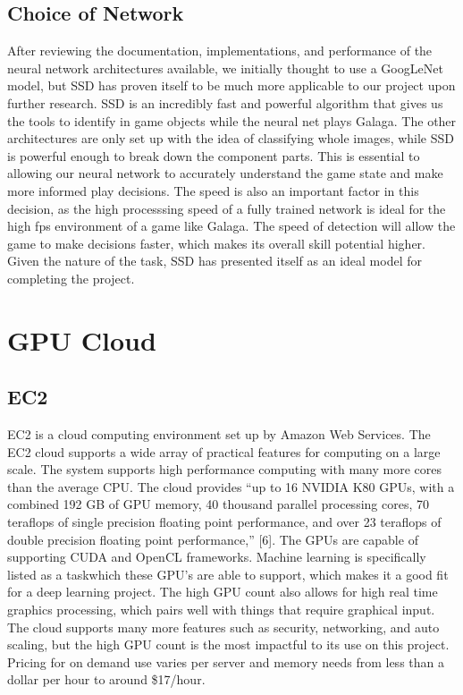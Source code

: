 \documentclass{scrreprt}
\begin{document}
\subsection{Choice of Network}
After reviewing the documentation, implementations, and performance of the neural network architectures available, we initially thought to use a GoogLeNet model, but SSD has proven itself to be much more applicable to our project upon further research. 
SSD is an incredibly fast and powerful algorithm that gives us the tools to identify in game objects while the neural net plays Galaga.
The other architectures are only set up with the idea of classifying whole images, while SSD is powerful enough to break down the component parts.
This is essential to allowing our neural network to accurately understand the game state and make more informed play decisions. 
The speed is also an important factor in this decision, as the high processsing speed of a fully trained network is ideal for the high fps environment of a game like Galaga. 
The speed of detection will allow the game to make decisions faster, which makes its overall skill potential higher.
Given the nature of the task, SSD has presented itself as an ideal model for completing the project.

\section{GPU Cloud}
\subsection{EC2}
EC2 is a cloud computing environment set up by Amazon Web Services. The EC2 cloud supports a wide array of practical features for computing on a large scale. 
The system supports high performance computing with many more cores than the average CPU. The cloud provides “up to 16 NVIDIA K80 GPUs, with a combined 192 GB of GPU memory, 40 thousand parallel processing cores, 70 teraflops of single precision floating point performance, and over 23 teraflops of double precision floating point performance,” [6]. 
The GPUs are capable of supporting CUDA and OpenCL frameworks. 
Machine learning is specifically listed as a taskwhich these GPU’s are able to support, which makes it a good fit for a deep learning project. 
The high GPU count also allows for high real time graphics processing, which pairs well with things that require graphical input.
The cloud supports many more features such as security, networking, and auto scaling, but the high GPU count is the most impactful to its use on this project. 
Pricing for on demand use varies per server and memory needs from less than a dollar per hour to around \$17/hour.
\end{document}
